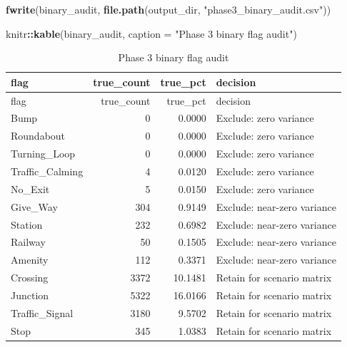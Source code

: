 \documentclass[
]{article}
\newenvironment{Shaded}{\begin{snugshade}}{\end{snugshade}}
\newcommand{\AttributeTok}[1]{\textcolor[rgb]{0.13,0.29,0.53}{#1}}
\newcommand{\FunctionTok}[1]{\textcolor[rgb]{0.13,0.29,0.53}{\textbf{#1}}}
\newcommand{\NormalTok}[1]{#1}
\newcommand{\SpecialCharTok}[1]{\textcolor[rgb]{0.81,0.36,0.00}{\textbf{#1}}}
\newcommand{\StringTok}[1]{\textcolor[rgb]{0.31,0.60,0.02}{#1}}
\begin{document}
\begin{Shaded}
\begin{Highlighting}[]
\FunctionTok{fwrite}\NormalTok{(binary\_audit, }\FunctionTok{file.path}\NormalTok{(output\_dir, }\StringTok{"phase3\_binary\_audit.csv"}\NormalTok{))}

\NormalTok{knitr}\SpecialCharTok{::}\FunctionTok{kable}\NormalTok{(binary\_audit, }\AttributeTok{caption =} \StringTok{"Phase 3 binary flag audit"}\NormalTok{)}
\end{Highlighting}
\end{Shaded}

\begin{longtable}[]{@{}lrrl@{}}
\caption{Phase 3 binary flag audit}\tabularnewline
\toprule\noalign{}
flag & true\_count & true\_pct & decision \\
\midrule\noalign{}
\endfirsthead
\toprule\noalign{}
flag & true\_count & true\_pct & decision \\
\midrule\noalign{}
\endhead
\bottomrule\noalign{}
\endlastfoot
Bump & 0 & 0.0000 & Exclude: zero variance \\
Roundabout & 0 & 0.0000 & Exclude: zero variance \\
Turning\_Loop & 0 & 0.0000 & Exclude: zero variance \\
Traffic\_Calming & 4 & 0.0120 & Exclude: zero variance \\
No\_Exit & 5 & 0.0150 & Exclude: zero variance \\
Give\_Way & 304 & 0.9149 & Exclude: near-zero variance \\
Station & 232 & 0.6982 & Exclude: near-zero variance \\
Railway & 50 & 0.1505 & Exclude: near-zero variance \\
Amenity & 112 & 0.3371 & Exclude: near-zero variance \\
Crossing & 3372 & 10.1481 & Retain for scenario matrix \\
Junction & 5322 & 16.0166 & Retain for scenario matrix \\
Traffic\_Signal & 3180 & 9.5702 & Retain for scenario matrix \\
Stop & 345 & 1.0383 & Retain for scenario matrix \\
\end{longtable}
\end{document}
